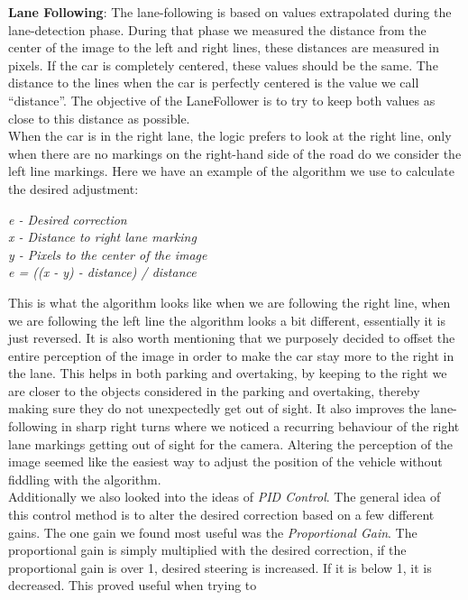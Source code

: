 \noindent
\textbf{Lane Following}: The lane-following is based on values extrapolated
during the lane-detection phase. During that phase we measured the distance from
the center of the image to the left and right lines, these distances are
measured in pixels. If the car is completely centered, these values should be
the same. The distance to the lines when the car is perfectly centered is the
value we call ``distance''. The objective of the LaneFollower is to try to keep
both values as close to this distance as possible.\\
When the car is in the right lane, the logic prefers to look at the right line,
only when there are no markings on the right-hand side of the road do we
consider the left line markings. Here we have an example of the algorithm we use
to calculate the desired adjustment:
\begin{center}
\itshape
e - Desired correction\\
x - Distance to right lane marking\\
y - Pixels to the center of the image\\
\vspace{3mm}
e = ((x - y) - distance) / distance
\end{center}
This is what the algorithm looks like when we are following the right line, when
we are following the left line the algorithm looks a bit different, essentially
it is just reversed. It is also worth mentioning that we purposely decided to
offset the entire perception of the image in order to make the car stay more to
the right in the lane. This helps in both parking and overtaking, by keeping to
the right we are closer to the objects considered in the parking and overtaking,
thereby making sure they do not unexpectedly get out of sight. It also improves
the lane-following in sharp right turns where we noticed a recurring behaviour
of the right lane markings getting out of sight for the camera. Altering the
perception of the image seemed like the easiest way to adjust the position of
the vehicle without fiddling with the algorithm.\\
Additionally we also looked into the ideas of  \textit{PID Control}. The
general idea of this control method is to alter the desired correction based on
a few different gains. The one gain we found most useful was the
\textit{Proportional Gain}. The proportional gain is simply multiplied with
the desired correction, if the proportional gain is over 1, desired steering is
increased. If it is below 1, it is decreased. This proved useful when trying to
